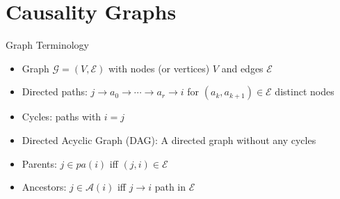 \documentclass{beamer} %
\def\gcg{\mathcal{G}}  %
\def\gcge{\mathcal{E}}  %
\newcommand{\pa}[1]{pa(#1)}  %
\newcommand{\anc}[1]{\mathcal{A}(#1)}  %
\begin{document}
\section{Causality Graphs}
\begin{frame}{Graph Terminology}
  \begin{itemize}
    \item{Graph $\gcg = (V, \gcge)$ with nodes (or vertices) $V$ and edges $\gcge$}\pause
    \item{Directed paths: $j \rightarrow a_0 \rightarrow \cdots \rightarrow a_r \rightarrow i$ for $(a_{k}, a_{k + 1}) \in \gcge$ distinct nodes}\pause
    \item{Cycles: paths with $i = j$}
    \item{Directed Acyclic Graph (DAG): A directed graph without any cycles}\pause
    \item{Parents: $j \in \pa{i}$ iff $(j, i) \in \gcge$}\pause
    \item{Ancestors: $j \in \anc{i}$ iff $j \rightarrow i$ path in $\gcge$}\pause
  \end{itemize}
\end{frame}
\end{document}
